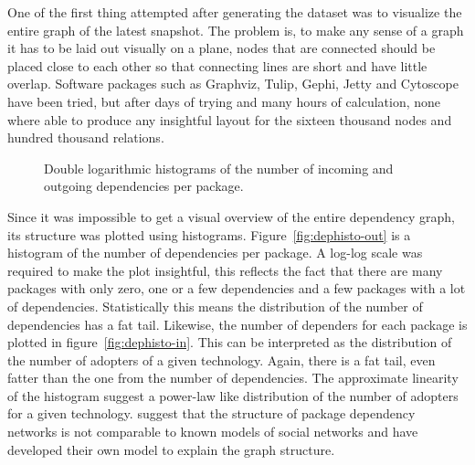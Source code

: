 \documentclass[smallextended,final]{svjour3}
\begin{document}
One of the first thing attempted after generating the dataset was to visualize the entire graph of the latest snapshot. The problem is, to make any sense of a graph it has to be laid out visually on a plane, nodes that are connected should be placed close to each other so that connecting lines are short and have little overlap. Software packages such as Graphviz, Tulip, Gephi, Jetty and Cytoscope have been tried, but after days of trying and many hours of calculation, none where able to produce any insightful layout for the sixteen thousand nodes and hundred thousand relations.

\begin{figure}
\centering
{}
\caption{Double logarithmic histograms of the number of incoming and outgoing dependencies per package.}
\end{figure}

Since it was impossible to get a visual overview of the entire dependency graph, its structure was plotted using histograms. Figure~\ref{fig:dephisto-out} is a histogram of the number of dependencies per package. A log-log scale was required to make the plot insightful, this reflects the fact that there are many packages with only zero, one or a few dependencies and a few packages with a lot of dependencies. Statistically this means the distribution of the number of dependencies has a fat tail. Likewise, the number of dependers for each package is plotted in figure~\ref{fig:dephisto-in}. This can be interpreted as the distribution of the number of adopters of a given technology. Again, there is a fat tail, even fatter than the one from the number of dependencies. The approximate linearity of the histogram suggest a power-law like distribution of the number of adopters for a given technology. \citet{zheng08} suggest that the structure of package dependency networks is not comparable to known models of social networks and have developed their own model to explain the graph structure.
\end{document}
